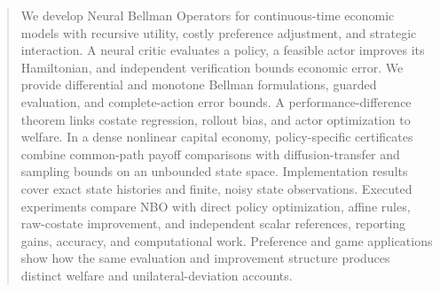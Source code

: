 \begin{abstract}
We develop Neural Bellman Operators for continuous-time economic models with recursive utility, costly preference adjustment, and strategic interaction. A neural critic evaluates a policy, a feasible actor improves its Hamiltonian, and independent verification bounds economic error. We provide differential and monotone Bellman formulations, guarded evaluation, and complete-action error bounds. A performance-difference theorem links costate regression, rollout bias, and actor optimization to welfare. In a dense nonlinear capital economy, policy-specific certificates combine common-path payoff comparisons with diffusion-transfer and sampling bounds on an unbounded state space. Implementation results cover exact state histories and finite, noisy state observations. Executed experiments compare NBO with direct policy optimization, affine rules, raw-costate improvement, and independent scalar references, reporting gains, accuracy, and computational work. Preference and game applications show how the same evaluation and improvement structure produces distinct welfare and unilateral-deviation accounts.
\end{abstract}
